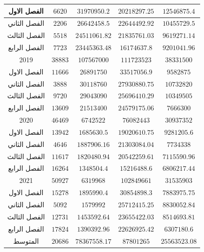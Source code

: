 \documentclass[10pt,a4paper]{report}
\begin{document}
\begin{longtable}{|c|c|c|c|c|}
	الفصل الاول  & $6620$  & $31970950.2$  & $20218297.25$ & $12546875.4$  \\ \hline
	الفصل الثاني & $2206$  & $26642458.5$  & $22644492.92$ & $10455729.5$  \\ \hline
	الفصل الثالث & $5518$  & $24511061.82$ & $21835761.03$ & $9619271.14$  \\ \hline
	الفصل الرابع & $7723$  & $23445363.48$ & $16174637.8$  & $9201041.96$  \\ \hline
	2019         & $38883$ & $107567000$   & $111723523$   & $38331500$    \\ \hline
	الفصل الاول  & $11666$ & $26891750$    & $33517056.9$  & $9582875$     \\ \hline
	الفصل الثاني & $3888$  & $30118760$    & $27930880.75$ & $10732820$    \\ \hline
	الفصل الثالث & $9720$  & $29043090$    & $25696410.29$ & $10349505$    \\ \hline
	الفصل الرابع & $13609$ & $21513400$    & $24579175.06$ & $7666300$     \\ \hline
	2020         & $46469$ & $6742522$     & $76082443$    & $30937352$    \\ \hline
	الفصل الاول  & $13942$ & $1685630.5$   & $19020610.75$ & $9281205.6$   \\ \hline
	الفصل الثاني & $4646$  & $1887906.16$  & $21303084.04$ & $7734338$     \\ \hline
	الفصل الثالث & $11617$ & $1820480.94$  & $20542259.61$ & $7115590.96$  \\ \hline
	الفصل الرابع & $16264$ & $1348504.4$   & $15216488.6$  & $6806217.44$  \\ \hline
	2021         & $50927$ & $6319968$     & $102849661$   & $31535903$    \\ \hline
	الفصل الاول  & $15278$ & $1895990.4$   & $30854898.3$  & $7883975.75$  \\ \hline
	الفصل الثاني & $5092$  & $1579992$     & $25712415.25$ & $8830052.84$  \\ \hline
	الفصل الثالث & $12731$ & $1453592.64$  & $23655422.03$ & $8514693.81$  \\ \hline
	الفصل الرابع & $17824$ & $1390392.96$  & $22626925.42$ & $6307180.6$   \\ \hline
	\rowcolor[HTML]{DAE8FC} 
	المتوسط      & $20686$ & $78367558.17$ & $87801265$    & $25563523.08$ \\ \hline
\end{longtable}	
\end{document}
